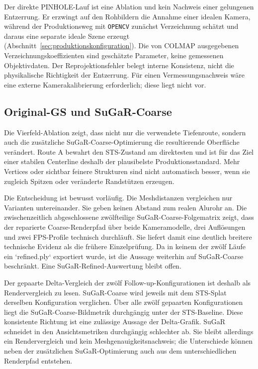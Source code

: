 Der direkte PINHOLE-Lauf ist eine Ablation und kein Nachweis einer gelungenen
Entzerrung. Er erzwingt auf den Rohbildern die Annahme einer idealen Kamera,
während der Produktionsweg mit \texttt{OPENCV} zunächst Verzeichnung schätzt
und daraus eine separate ideale Szene erzeugt
(Abschnitt~\ref{sec:produktionskonfiguration}). Die von COLMAP ausgegebenen
Verzeichnungskoeffizienten sind geschätzte Parameter, keine gemessenen
Objektivdaten. Der Reprojektionsfehler belegt interne Konsistenz, nicht die
physikalische Richtigkeit der Entzerrung. Für einen Vermessungsnachweis wäre
eine externe Kamerakalibrierung erforderlich; diese liegt nicht vor.

\subsection{Original-GS und SuGaR-Coarse}

Die Vierfeld-Ablation zeigt, dass nicht nur die verwendete Tiefenroute, sondern
auch die zusätzliche SuGaR-Coarse-Optimierung die resultierende Oberfläche
verändert. Route A bewahrt den STS-Zustand am direktesten und ist für das Ziel
einer stabilen Centerline deshalb der plausibelste Produktionsstandard. Mehr
Vertices oder sichtbar feinere Strukturen sind nicht automatisch besser, wenn
sie zugleich Spitzen oder veränderte Randstützen erzeugen.

Die Entscheidung ist bewusst vorläufig. Die Meshdistanzen vergleichen nur
Varianten untereinander. Sie geben keinen Abstand zum realen Alurohr an. Die
zwischenzeitlich abgeschlossene zwölfteilige SuGaR-Coarse-Folgematrix zeigt,
dass der reparierte Coarse-Renderpfad über beide Kameramodelle, drei
Auflösungen und zwei FPS-Profile technisch durchläuft. Sie liefert damit eine
deutlich breitere technische Evidenz als die frühere Einzelprüfung. Da in keinem
der zwölf Läufe ein `refined.ply` exportiert wurde, ist die Aussage weiterhin
auf SuGaR-Coarse beschränkt. Eine SuGaR-Refined-Auswertung bleibt offen.

Der gepaarte Delta-Vergleich der zwölf Follow-up-Konfigurationen ist deshalb
als Rendervergleich zu lesen. SuGaR-Coarse wird jeweils mit dem STS-Splat
derselben Konfiguration verglichen. Über alle zwölf gepaarten Konfigurationen
liegt die SuGaR-Coarse-Bildmetrik durchgängig unter der STS-Baseline. Diese
konsistente Richtung ist eine zulässige Aussage der Delta-Grafik. SuGaR
schneidet in den Ansichtsmetriken durchgängig schlechter ab. Sie bleibt
allerdings ein Rendervergleich und kein Meshgenauigkeitsnachweis; die
Unterschiede können neben der zusätzlichen SuGaR-Optimierung auch aus dem
unterschiedlichen Renderpfad entstehen.

